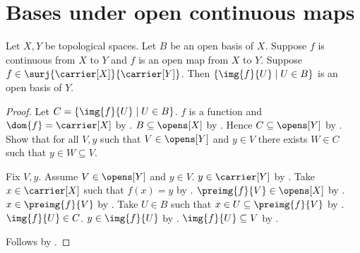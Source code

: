 \section{Bases under open continuous maps}




\begin{theorem}\label{open_continuous_surjection_maps_basis}
    Let $X,Y$ be topological spaces.
    Let $B$ be an open basis of $X$.
    Suppose $f$ is continuous from $X$ to $Y$ and $f$ is an open map from $X$ to $Y$.
    Suppose $f\in\surj{\carrier[X]}{\carrier[Y]}$.
    Then $\{\img{f}{U}\mid U\in B\}$ is an open basis of $Y$.
\end{theorem}
\begin{proof}
    Let $C=\{\img{f}{U}\mid U\in B\}$.
    $f$ is a function and $\dom{f}=\carrier[X]$ by
        .
    $B\subseteq\opens[X]$ by .
    Hence $C\subseteq\opens[Y]$ by .
    Show that for all $V,y$ such that $V\in\opens[Y]$ and $y\in V$
        there exists $W\in C$ such that $y\in W\subseteq V$.
    \begin{subproof}
        Fix $V,y$.
        Assume $V\in\opens[Y]$ and $y\in V$.
        $y\in\carrier[Y]$ by .
        Take $x\in\carrier[X]$ such that $f(x)=y$ by .
        $\preimg{f}{V}\in\opens[X]$ by .
        $x\in\preimg{f}{V}$ by .
        Take $U\in B$ such that $x\in U\subseteq\preimg{f}{V}$ by .
        $\img{f}{U}\in C$.
        $y\in\img{f}{U}$ by .
        $\img{f}{U}\subseteq V$ by
            .
    \end{subproof}
    Follows by .
\end{proof}
